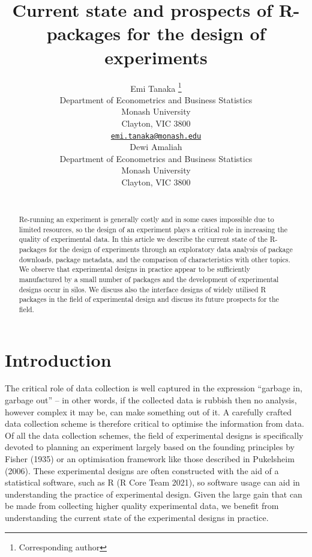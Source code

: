 \documentclass{article}
\title{Current state and prospects of R-packages for the design of
experiments}
\author{
    Emi Tanaka
    \thanks{Corresponding author}
   \\
    Department of Econometrics and Business Statistics \\
    Monash University \\
  Clayton, VIC 3800 \\
  \texttt{\href{mailto:emi.tanaka@monash.edu}{\nolinkurl{emi.tanaka@monash.edu}}} \\
   \And
    Dewi Amaliah
   \\
    Department of Econometrics and Business Statistics \\
    Monash University \\
  Clayton, VIC 3800 \\
  \texttt{} \\
  }
\begin{document}
\maketitle


\begin{abstract}
Re-running an experiment is generally costly and in some cases
impossible due to limited resources, so the design of an experiment
plays a critical role in increasing the quality of experimental data. In
this article we describe the current state of the R-packages for the
design of experiments through an exploratory data analysis of package
downloads, package metadata, and the comparison of characteristics with
other topics. We observe that experimental designs in practice appear to
be sufficiently manufactured by a small number of packages and the
development of experimental designs occur in silos. We discuss also the
interface designs of widely utilised R packages in the field of
experimental design and discuss its future prospects for the field.
\end{abstract}


\hypertarget{introduction}{%
\section{Introduction}\label{introduction}}

The critical role of data collection is well captured in the expression
``garbage in, garbage out'' -- in other words, if the collected data is
rubbish then no analysis, however complex it may be, can make something
out of it. A carefully crafted data collection scheme is therefore
critical to optimise the information from data. Of all the data
collection schemes, the field of experimental designs is specifically
devoted to planning an experiment largely based on the founding
principles by Fisher (1935) or an optimisation framework like those
described in Pukelsheim (2006). These experimental designs are often
constructed with the aid of a statistical software, such as R (R Core
Team 2021), so software usage can aid in understanding the practice of
experimental design. Given the large gain that can be made from
collecting higher quality experimental data, we benefit from
understanding the current state of the experimental designs in practice.
\end{document}

